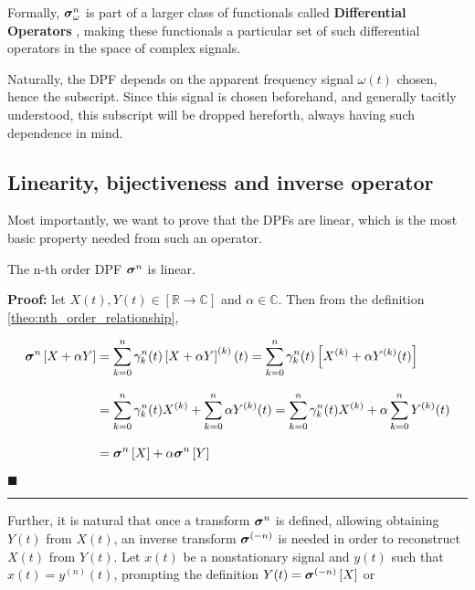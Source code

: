 	Formally, $\boldsymbol{\sigma}^{n}_\omega$ is part of a larger class of functionals called \textbf{Differential Operators} , making these functionals a particular set of such differential operators in the space of complex signals.

	Naturally, the DPF depends on the apparent frequency signal $\omega(t)$ chosen, hence the subscript. Since this signal is chosen beforehand, and generally tacitly understood, this subscript will be dropped hereforth, always having such dependence in mind.

\subsection{Linearity, bijectiveness and inverse operator} %

	Most importantly, we want to prove that the DPFs are linear, which is the most basic property needed from such an operator.

\begin{theorem}\label{theo:dpf_linearity}%
	The n-th order DPF $\boldsymbol{\sigma}^{n}$ is linear.
\end{theorem}
\textbf{Proof:} let $X(t),Y(t)\in\left[\mathbb{R}\to\mathbb{C}\right]$ and $\alpha\in\mathbb{C}$. Then from the definition \ref{theo:nth_order_relationship}, 

\begin{align}
	\boldsymbol{\sigma}^{n}\left[X + \alpha Y\right] &= \sum\limits_{k=0}^n \gamma_k^n(t) \left[X + \alpha Y\right]^{(k)}(t) = \sum\limits_{k=0}^n \gamma_k^n(t) \left[X^{(k)} + \alpha Y^{(k)}(t)\right] \nonumber\\[3mm]
	&= \sum\limits_{k=0}^n \gamma_k^n(t) X^{(k)} + \sum\limits_{k=0}^n \alpha Y^{(k)}(t) = \sum\limits_{k=0}^n \gamma_k^n(t) X^{(k)} + \alpha\sum\limits_{k=0}^n Y^{(k)}(t)  \nonumber\\[3mm]
	&= \boldsymbol{\sigma}^{n}\left[X\right] + \alpha \boldsymbol{\sigma}^{n}\left[Y\right]
\end{align}

\hfill$\blacksquare$
\vspace{5mm}
\hrule
\vspace{5mm}%

	Further, it is natural that once a transform $\boldsymbol{\sigma}^{n}$ is defined, allowing obtaining $Y(t)$ from $X(t)$, an inverse transform $\boldsymbol{\sigma}^{\left(-n\right)}$ is needed in order to reconstruct $X(t)$ from $Y(t)$. Let $x(t)$ be a nonstationary signal and $y(t)$ such that $x(t) = y^{(n)}(t)$, prompting the definition $Y(t) = \boldsymbol{\sigma}^{\left(-n\right)} \left[X\right]$ or

